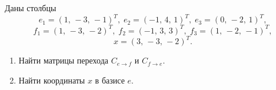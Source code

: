 Даны столбцы
\[
	e_{1} = (1,\,-3,\,-1)^{T},\;
	e_{2} = (-1,\,4,\,1)^{T},\;
	e_{3} = (0,\,-2,\,1)^{T},
\]
\[
	f_{1} = (1,\,-3,\,-2)^{T},\;
	f_{2} = (-1,\,3,\,3)^{T},\;
	f_{3} = (1,\,-2,\,-1)^{T},
\]
\[
	x = (3,\,-3,\,-2)^{T}.
\]
\begin{enumerate}
	\item Найти матрицы перехода $C_{e\to f}$ и $C_{f\to e}$.
	\item Найти координаты $x$ в базисе $e$.
\end{enumerate}